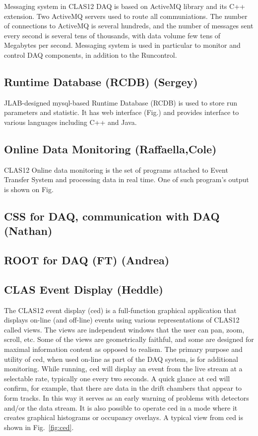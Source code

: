 Messaging system in CLAS12 DAQ is based on ActiveMQ library and its C++ extension. Two ActiveMQ servers used to route all communiations. The number of connections to ActiveMQ is several hundreds, and the number of messages sent every second is several tens of thousands, with data volume few tens of Megabytes per second. Messaging system is used in particular to monitor and control DAQ components, in addition to the Runcontrol.


\subsection{Runtime Database (RCDB) (Sergey)}

JLAB-designed mysql-based Runtime Database (RCDB) is used to store run parameters and statistic. It has web interface (Fig.) and provides interface to various languages including C++ and Java.


\subsection{Online Data Monitoring (Raffaella,Cole)}

CLAS12 Online data monitoring is the set of programs attached to Event Transfer System and processing data in real time. One of such program's output is shown on Fig.



\subsection{CSS for DAQ, communication with DAQ (Nathan)}



\subsection{ROOT for DAQ (FT) (Andrea)}




\subsection{CLAS Event Display (Heddle)}

The CLAS12 event display (ced) is a full-function graphical application that displays on-line (and off-line) events using various representations of CLAS12 called views. The views are independent windows that the user can pan, zoom, scroll, etc. Some of the views are geometrically faithful, and some are designed for maximal information content as opposed to realism. The primary purpose and utility of ced, when used on-line as part of the DAQ system, is for additional monitoring. While running, ced will display an event from the live stream at a selectable rate, typically one every two seconds. A quick glance at ced will confirm, for example, that there are data in the drift chambers that appear to form tracks. In this way it serves as an early warning of problems with detectors and/or the data stream. It is also possible to operate ced in a mode where it creates graphical histograms or occupancy overlays. A typical view from ced is shown in Fig.~\ref{fig:ced}.

